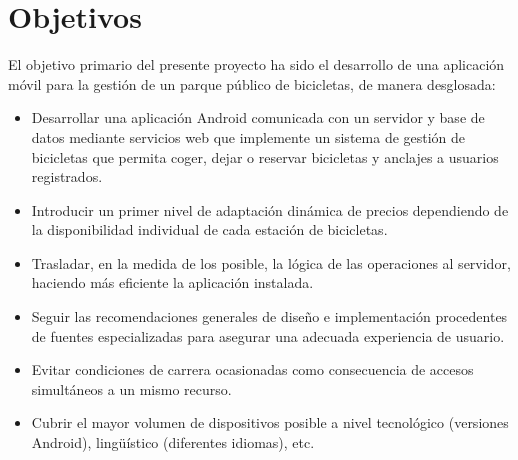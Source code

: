 \chapter{Objetivos}

El objetivo primario del presente proyecto ha sido el desarrollo de una aplicación móvil para la gestión de un parque público de bicicletas, de manera desglosada:

\begin{itemize}  
	\item Desarrollar una aplicación Android comunicada con un servidor y base de datos mediante servicios web que implemente un sistema de gestión de bicicletas que permita coger, dejar o reservar bicicletas y anclajes a usuarios registrados.
	\item Introducir un primer nivel de adaptación dinámica de precios dependiendo de la disponibilidad individual de cada estación de bicicletas.
	\item Trasladar, en la medida de los posible, la lógica de las operaciones al servidor, haciendo más eficiente la aplicación instalada.
	\item Seguir las recomendaciones generales de diseño e implementación procedentes de fuentes especializadas para asegurar una adecuada experiencia de usuario.
	\item Evitar condiciones de carrera ocasionadas como consecuencia de accesos simultáneos a un mismo recurso.
	\item Cubrir el mayor volumen de dispositivos posible a nivel tecnológico (versiones Android), lingüístico (diferentes idiomas), etc.
\end{itemize}